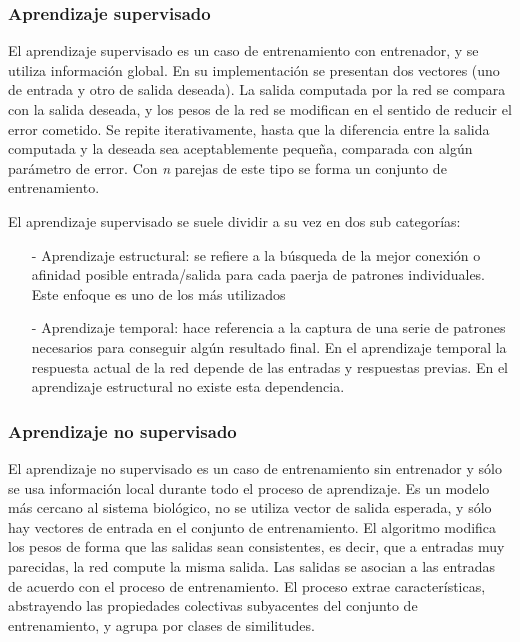 \subsubsection{Aprendizaje supervisado}

El aprendizaje supervisado es un caso de entrenamiento con entrenador, y se
utiliza información global. En su implementación se presentan dos vectores (uno
de entrada y otro de salida deseada).  La salida computada por la red se
compara con la salida deseada, y los pesos de la red se modifican en el
sentido de reducir el error cometido. Se repite iterativamente, hasta que la
diferencia entre la salida computada y la deseada sea aceptablemente pequeña,
comparada con algún parámetro de error. Con \emph{n} parejas de este tipo se
forma un conjunto de entrenamiento.

El aprendizaje supervisado se suele dividir a su vez en dos sub categorías:
\begin{itemize}
	\item[-] Aprendizaje estructural: se refiere a la búsqueda de la mejor 
conexión o afinidad posible entrada/salida para cada paerja de patrones 
individuales. Este enfoque es uno de los más utilizados
	\item[-] Aprendizaje temporal: hace referencia a la captura de una serie 
	de patrones necesarios para conseguir algún resultado final. En el aprendizaje 
	temporal la respuesta actual de la red depende de las entradas y respuestas 
	previas. En el aprendizaje estructural no existe esta dependencia.
\end{itemize}

\subsubsection{Aprendizaje no supervisado}

El aprendizaje no supervisado es un caso de entrenamiento sin entrenador y sólo
se usa información local durante todo el proceso de aprendizaje. Es un modelo
más cercano al sistema biológico, no se utiliza vector de salida esperada, y
sólo hay vectores de entrada en el conjunto de entrenamiento. El algoritmo
modifica los pesos de forma que las salidas sean consistentes, es decir, que a
entradas muy parecidas, la red compute la misma salida.  Las salidas se asocian
a las entradas de acuerdo con el proceso de entrenamiento. El proceso extrae
características, abstrayendo las propiedades colectivas subyacentes del
conjunto de entrenamiento, y agrupa por clases de similitudes.

